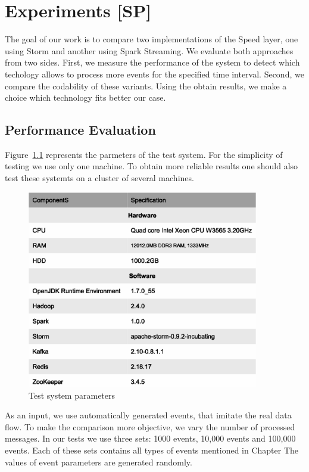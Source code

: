 \chapter{Experiments [SP]}
\label{chap:experiments}
The goal of our work is to compare two implementations of the Speed layer, one using Storm and another using Spark Streaming.
We evaluate both approaches from two sides.
First, we measure the performance of the system to detect which techology allows to process more events for the specified time interval.
Second, we compare the codability of these variants.
Using the obtain results, we make a choice which technology fits better our case.

\section{Performance Evaluation}

Figure~\ref{fig:test_system_parameters} represents the parmeters of the test system.
For the simplicity of testing we use only one machine.
To obtain more reliable results one should also test these systemts on a cluster of several machines.

\begin{figure}[h]
  \centering
  \includegraphics [width=0.9\textwidth]{images/test_system_parameters}
  \caption{Test system parameters}
  \label{fig:test_system_parameters}
\end{figure}

As an input, we use automatically generated events, that imitate the real data flow.
To make the comparison more objective, we vary the number of processed messages.
In our tests we use three sets: 1000 events, 10,000 events and 100,000 events.
Each of these sets contains all types of events mentioned in Chapter %
The values of event parameters are generated randomly.

